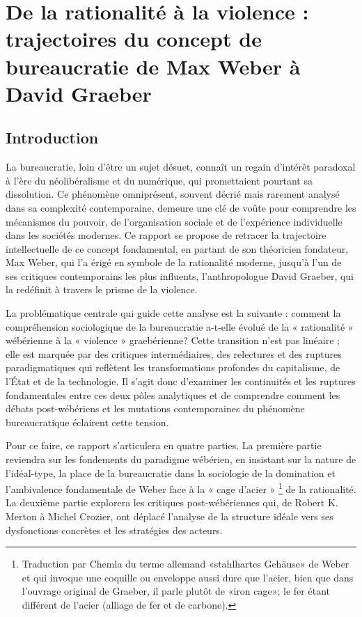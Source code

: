 \part{De la rationalité à la violence : trajectoires du concept de bureaucratie de Max Weber à David Graeber}

\chapter{Introduction}
La bureaucratie, loin d'être un sujet désuet, connaît un regain d'intérêt paradoxal à l'ère du néolibéralisme et du numérique, qui promettaient pourtant sa dissolution. Ce phénomène omniprésent, souvent décrié mais rarement analysé dans sa complexité contemporaine, demeure une clé de voûte pour comprendre les mécanismes du pouvoir, de l'organisation sociale et de l'expérience individuelle dans les sociétés modernes. Ce rapport se propose de retracer la trajectoire intellectuelle de ce concept fondamental, en partant de son théoricien fondateur, Max Weber, qui l'a érigé en symbole de la rationalité moderne, jusqu'à l'un de ses critiques contemporains les plus influents, l'anthropologue David Graeber, qui la redéfinit à travers le prisme de la violence.

La problématique centrale qui guide cette analyse est la suivante : comment la compréhension sociologique de la bureaucratie a-t-elle évolué de la « rationalité »  wébérienne à la « violence »  graebérienne? Cette transition n'est pas linéaire ; elle est marquée par des critiques intermédiaires, des relectures et des ruptures paradigmatiques qui reflètent les transformations profondes du capitalisme, de l'État et de la technologie. Il s'agit donc d'examiner les continuités et les ruptures fondamentales entre ces deux pôles analytiques et de comprendre comment les débats post-wébériens et les mutations contemporaines du phénomène bureaucratique éclairent cette tension.

Pour ce faire, ce rapport s'articulera en quatre parties. La première partie reviendra sur les fondements du paradigme wébérien, en insistant sur la nature de l'idéal-type, la place de la bureaucratie dans la sociologie de la domination et l'ambivalence fondamentale de Weber face à la « cage d'acier » \citet{Graeber2015} \footnote{Traduction par Chemla du terme allemand «stahlhartes Gehäuse» de Weber et qui invoque une coquille ou enveloppe aussi dure que l'acier, bien que dans l'ouvrage original de Graeber, il parle plutôt de «iron cage»; le fer étant différent de l'acier (alliage de fer et de carbone).} de la rationalité. La deuxième partie explorera les critiques post-wébériennes qui, de Robert K. Merton à Michel Crozier, ont déplacé l'analyse de la structure idéale vers ses dysfonctions concrètes et les stratégies des acteurs. \\

